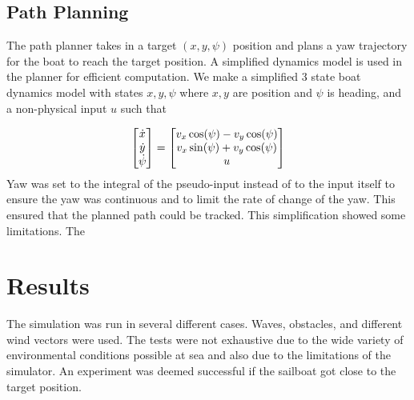 \documentclass[conference]{IEEEtran}
\begin{document}
\subsection{Path Planning}
The path planner takes in a target \((x, y, \psi)\) position and plans a yaw trajectory for the boat to reach the target position. A simplified dynamics model is used in the planner for efficient computation. 
\cite{Andersson2018}
We make a simplified 3 state boat dynamics model with states \(x, y, \psi\) where  \(x, y\) are position and \(\psi\) is heading, and a non-physical input \(u\) such that 
    
    \begin{equation}
        \mqty[\dot{x} \\ \dot{y} \\ \dot{\psi}]
         = \mqty[v_x \cos(\psi) - v_y \cos(\psi) \\ 
         v_x \sin(\psi) + v_y\cos(\psi) \\ 
         u]
         \label{eq:simplified_dynamics}
    \end{equation}
Yaw was set to the integral of the pseudo-input instead of to the input itself to ensure the yaw was continuous and to limit the rate of change of the yaw. This ensured that the planned path could be tracked. This simplification showed some limitations. The 


\section{Results}
The simulation was run in several different cases. Waves, obstacles, and different wind vectors were used. The tests were not exhaustive due to the wide variety of environmental conditions possible at sea and also due to the limitations of the simulator. An experiment was deemed successful if the sailboat got close to the target position.
\end{document}

